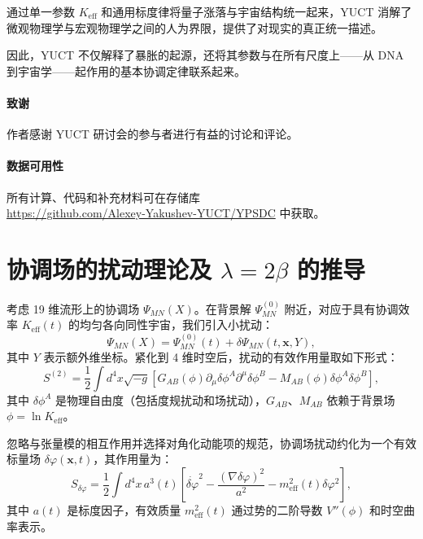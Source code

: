 \documentclass[12pt]{article}
\theoremstyle{remark}
\newcommand{\Keff}{K_{\mathrm{eff}}}
\begin{document}
	通过单一参数 $K_{\mathrm{eff}}$ 和通用标度律将量子涨落与宇宙结构统一起来，YUCT 消解了微观物理学与宏观物理学之间的人为界限，提供了对现实的真正统一描述。
	
	因此，YUCT 不仅解释了暴胀的起源，还将其参数与在所有尺度上——从 DNA 到宇宙学——起作用的基本协调定律联系起来。
	
	\paragraph*{致谢}
	作者感谢 YUCT 研讨会的参与者进行有益的讨论和评论。
	
	\paragraph*{数据可用性}
	所有计算、代码和补充材料可在存储库 \\ \url{https://github.com/Alexey-Yakushev-YUCT/YPSDC} 中获取。
	
	\appendix
	\section{协调场的扰动理论及 $\lambda = 2\beta$ 的推导}
	\label{app:perturbations}
	
	考虑 19 维流形上的协调场 $\Psi_{MN}(X)$。在背景解 $\Psi^{(0)}_{MN}$ 附近，对应于具有协调效率 $\Keff(t)$ 的均匀各向同性宇宙，我们引入小扰动：
	\begin{equation}
		\Psi_{MN}(X) = \Psi^{(0)}_{MN}(t) + \delta\Psi_{MN}(t,\mathbf{x},Y),
	\end{equation}
	其中 $Y$ 表示额外维坐标。紧化到 4 维时空后，扰动的有效作用量取如下形式：
	\begin{equation}
		S^{(2)} = \frac{1}{2} \int d^4x \sqrt{-g} \left[ G_{AB}(\phi) \partial_\mu \delta\phi^A \partial^\mu \delta\phi^B - M_{AB}(\phi) \delta\phi^A \delta\phi^B \right],
	\end{equation}
	其中 $\delta\phi^A$ 是物理自由度（包括度规扰动和场扰动），$G_{AB}$、$M_{AB}$ 依赖于背景场 $\phi = \ln\Keff$。
	
	忽略与张量模的相互作用并选择对角化动能项的规范，协调场扰动约化为一个有效标量场 $\delta\varphi(\mathbf{x},t)$，其作用量为：
	\begin{equation}
		S_{\delta\varphi} = \frac{1}{2} \int d^4x \, a^3(t) \left[ \dot{\delta\varphi}^2 - \frac{(\nabla\delta\varphi)^2}{a^2} - m_{\mathrm{eff}}^2(t) \delta\varphi^2 \right],
	\end{equation}
	其中 $a(t)$ 是标度因子，有效质量 $m_{\mathrm{eff}}^2(t)$ 通过势的二阶导数 $V''(\phi)$ 和时空曲率表示。
	
\end{document}
